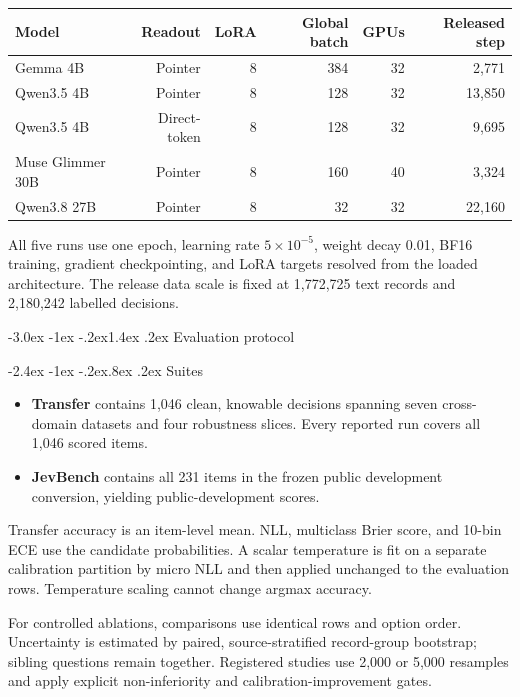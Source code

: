 \documentclass[10pt]{article}
\makeatletter
\renewcommand\section{\@startsection{section}{1}{\z@}%
  {-3.0ex \@plus -1ex \@minus -.2ex}{1.4ex \@plus .2ex}%
  {\color{navy}\Large\bfseries}}
\renewcommand\subsection{\@startsection{subsection}{2}{\z@}%
  {-2.4ex \@plus -1ex \@minus -.2ex}{.8ex \@plus .2ex}%
  {\color{blue}\large\bfseries}}
\makeatother
\begin{document}
\begin{tabular}{p{.30\linewidth}rrrrr}
\toprule
Model & Readout & LoRA & Global batch & GPUs & Released step \\
\midrule
Gemma 4B & Pointer & 8 & 384 & 32 & 2,771 \\
Qwen3.5 4B & Pointer & 8 & 128 & 32 & 13,850 \\
Qwen3.5 4B & Direct-token & 8 & 128 & 32 & 9,695 \\
Muse Glimmer 30B & Pointer & 8 & 160 & 40 & 3,324 \\
Qwen3.8 27B & Pointer & 8 & 32 & 32 & 22,160 \\
\bottomrule
\end{tabular}

All five runs use one epoch, learning rate $5\times10^{-5}$, weight decay 0.01,
BF16 training, gradient checkpointing, and LoRA targets resolved from the loaded
architecture. The release data scale is fixed at 1,772,725 text records and
2,180,242 labelled decisions.

\section{Evaluation protocol}

\subsection{Suites}

\begin{itemize}
  \item \textbf{Transfer} contains 1,046 clean, knowable decisions spanning seven
  cross-domain datasets and four robustness slices. Every reported run covers all
  1,046 scored items.
  \item \textbf{JevBench} contains all 231 items in the frozen public development
  conversion, yielding public-development scores.
\end{itemize}

Transfer accuracy is an item-level mean. NLL, multiclass Brier score, and
10-bin ECE use the candidate probabilities. A scalar temperature is fit on a
separate calibration partition by micro NLL and then applied unchanged to the
evaluation rows. Temperature scaling cannot change argmax accuracy.

For controlled ablations, comparisons use identical rows and option order.
Uncertainty is estimated by paired, source-stratified record-group bootstrap;
sibling questions remain together. Registered studies use 2,000 or 5,000
resamples and apply explicit non-inferiority and calibration-improvement gates.
\end{document}
